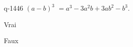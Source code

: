 \begin{truefalse}{q-1446}
$(a-b)^3$ $=a^3-3a^2b+3ab^2-b^3$.
\item* Vrai
\item Faux
\end{truefalse}

